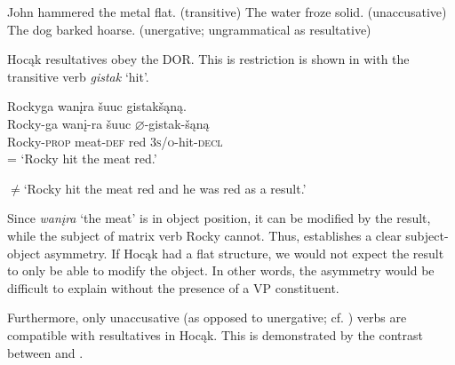 \documentclass[output=paper]{LSP/langsci}
\begin{document}
\begin{exe}
\ex
\begin{xlist}
\ex John hammered the metal flat.	(transitive)
\ex The water froze solid.						(unaccusative)
\ex *The dog barked hoarse.	(unergative; ungrammatical as resultative)
\end{xlist}
\end{exe}
	
Hocąk resultatives obey the DOR. This is restriction is shown in  with the transitive verb \textit{gistak} `hit'.

\begin{exe}
\ex 
\glll Rockyga			wan\k{i}ra			\v{s}uuc 		gistak\v{s}ąną.\\
Rocky-ga		wan\k{i}-ra		\v{s}uuc		$\varnothing$-gistak-\v{s}ąną \\
Rocky-\textsc{prop}	meat-\textsc{def}	red			\textsc{3s/o}-hit-\textsc{decl} \\
\trans = `Rocky hit the meat red.'

$\neq$`Rocky hit the meat red and he was red as a result.'
\end{exe}

Since \textit{wan\k{i}ra} `the meat' is in object position, it can be modified by the result, while the subject of matrix verb Rocky cannot. Thus,  establishes a clear subject-object asymmetry. If Hocąk had a flat structure, we would not expect the result to only be able to modify the object. In other words, the asymmetry would be difficult to explain without the presence of a VP constituent.
	
Furthermore, only unaccusative (as opposed to unergative; cf. \citealt{Perlmutter1978}) verbs are compatible with resultatives in Hocąk. This is demonstrated by the contrast between  and .
\end{document}
